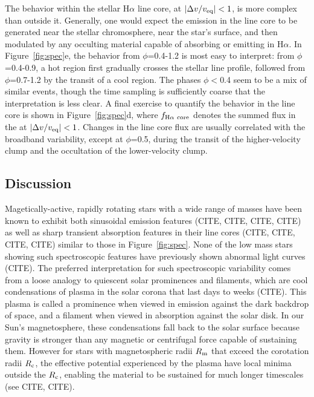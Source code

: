 \documentclass{nature3}
\begin{document}
The behavior within the stellar H$\alpha$ line core, at $|\Delta v /
v_{\rm eq}|<1$, is more complex than outside it.  Generally, one would
expect the emission in the line core to be generated near the stellar
chromosphere, near the star's surface, and then modulated by any
occulting material capable of absorbing or emitting in H$\alpha$.  In
Figure~\ref{fig:spec}e, the behavior from $\phi$=0.4-1.2 is most
easy to interpret: from $\phi$=0.4-0.9, a hot region first gradually
crosses the stellar line profile, followed from $\phi$=0.7-1.2 by the
transit of a cool region.  The phases $\phi$$<$0.4 seem to be a mix of
similar events, though the time sampling is sufficiently coarse that
the interpretation is less clear.  A final exercise to quantify the
behavior in the line core is shown in Figure~\ref{fig:spec}d, where
$f_{\rm H\alpha\ core}$ denotes the summed flux in the at $|\Delta v /
v_{\rm eq}|<1$.  Changes in the line core flux are usually correlated
with the broadband variability, except at $\phi$=0.5, during the
transit of the higher-velocity clump and the occultation of the
lower-velocity clump.


\subsection{Discussion}

Magetically-active, rapidly rotating stars with a wide range of masses
have been known to exhibit both sinusoidal emission features (CITE,
CITE, CITE, CITE) as well as sharp transient absorption features in
their line cores (CITE, CITE, CITE, CITE) similar to those in
Figure~\ref{fig:spec}.
None of the low mass stars showing such spectroscopic features have
previously shown abnormal light curves (CITE).
The preferred interpretation for such spectroscopic variability comes
from a loose analogy to quiescent solar prominences and filaments,
which are cool condensations of plasma in the solar corona that last
days to weeks (CITE).
This plasma is called a prominence when viewed in emission against the
dark backdrop of space, and a filament when viewed in absorption
against the solar disk.
In our Sun's magnetosphere, these condensations fall back to
the solar surface because gravity is stronger than any magnetic or
centrifugal force capable of sustaining them.
However for stars with magnetospheric radii $R_{\rm m}$ that exceed the
corotation radii $R_{\rm c}$, the effective potential experienced by
the plasma have local minima outside the $R_{\rm c}$, enabling the
material to be sustained for much longer timescales (see CITE, CITE).
\end{document}
